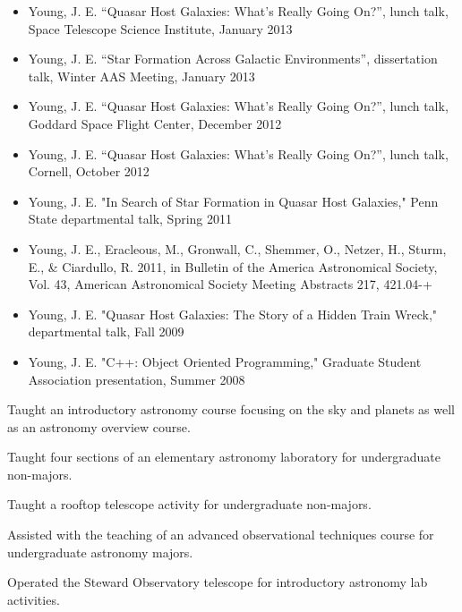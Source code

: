 \begin{small}
\pagebreak
{}
\begin{itemize}
\item  Young, J. E. ``Quasar Host Galaxies: What's Really Going On?'', lunch talk, Space Telescope Science Institute, January 2013
\item  Young, J. E. ``Star Formation Across Galactic Environments'', dissertation talk, Winter AAS Meeting, January 2013
\item  Young, J. E. ``Quasar Host Galaxies: What's Really Going On?'', lunch talk, Goddard Space Flight Center, December 2012
\item  Young, J. E. ``Quasar Host Galaxies: What's Really Going On?'', lunch talk, Cornell, October 2012
\item  Young, J. E. "In Search of Star Formation in Quasar Host Galaxies," Penn State departmental talk, Spring 2011
\item  Young, J. E., Eracleous, M., Gronwall, C., Shemmer, O., Netzer, H., Sturm, E., \& Ciardullo, R. 2011, in Bulletin of the America
 Astronomical Society, Vol. 43, American Astronomical Society Meeting Abstracts 217, 421.04-+
\item  Young, J. E. "Quasar Host Galaxies: The Story of a Hidden Train Wreck," departmental talk, Fall 2009
\item  Young, J. E. "C++: Object Oriented Programming," Graduate Student Association presentation, Summer 2008
\end{itemize}



{Taught an introductory astronomy course focusing on the sky and planets as well as an astronomy overview course.}


{Taught four sections of an elementary astronomy laboratory for undergraduate non-majors.}

{Taught a rooftop telescope activity for undergraduate non-majors.}

{Assisted with the teaching of an advanced observational techniques course for undergraduate astronomy majors.}


{Operated the Steward Observatory telescope for introductory astronomy lab activities.}
\\\pagebreak
{}


\end{small}
